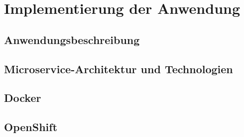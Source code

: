 \documentclass[master,german]{hgbthesis}
\begin{document}
\chapter{Implementierung der Anwendung}
\section{Anwendungsbeschreibung}
\section{Microservice-Architektur und Technologien}
\section{Docker}
\section{OpenShift}



\end{document}
